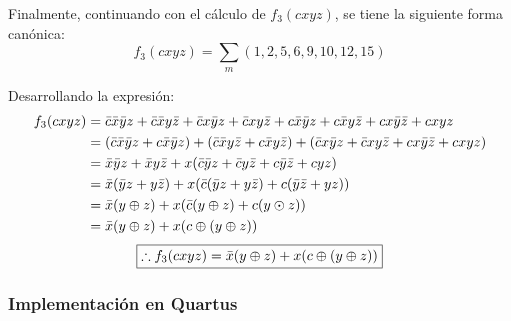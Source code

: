 \documentclass[../procedimientos.tex]{subfiles}
\begin{document}
Finalmente, continuando con el cálculo de $f_3(cxyz)$, se tiene la siguiente 
forma canónica:
\begin{equation*}
  f_3(cxyz) = \sum_m (1, 2, 5, 6, 9, 10, 12, 15)
\end{equation*}

Desarrollando la expresión:
\begin{align*}
  f_3(cxyz) &= \bar{c}\bar{x}\bar{y}z + \bar{c}\bar{x}y\bar{z} + \bar{c}x\bar{y}z + 
  \bar{c}xy\bar{z} + c\bar{x}\bar{y}z + c\bar{x}y\bar{z} + cx\bar{y}\bar{z} + cxyz\\
  &= (\bar{c}\bar{x}\bar{y}z + c\bar{x}\bar{y}z) + (\bar{c}\bar{x}y\bar{z} + 
  c\bar{x}y\bar{z}) + (\bar{c}x\bar{y}z + \bar{c}xy\bar{z} + cx\bar{y}\bar{z} + 
  cxyz)\\
  &= \bar{x}\bar{y}z + \bar{x}y\bar{z} + x(\bar{c}\bar{y}z + \bar{c}y\bar{z} + 
  c\bar{y}\bar{z} + cyz)\\
  &= \bar{x}(\bar{y}z + y\bar{z}) + x(\bar{c}(\bar{y}z + y\bar{z}) + c(\bar{y}\bar{z} 
  + yz))\\
  &= \bar{x}(y \oplus z) + x(\bar{c}(y \oplus z) + c(y \odot z))\\
  &= \bar{x}(y \oplus z) + x(c \oplus (y \oplus z))
\end{align*}
\begin{equation*}
  \boxed{
    \therefore f_3(cxyz) = \bar{x}(y \oplus z) + x(c \oplus (y \oplus z))
  }
\end{equation*}


\subsubsection{Implementación en Quartus}
\end{document}
